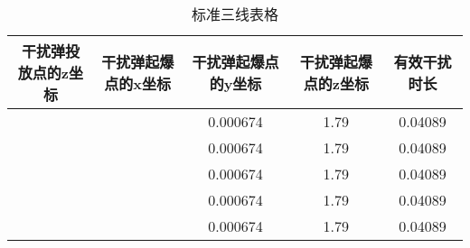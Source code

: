 \documentclass[../main.tex]{subfiles}
\begin{document}
\begin{table}[H]
\caption{标准三线表格}
\label{tab:031} 
\centering
\begin{small}
\begin{tabular}{ccccc}
\toprule[1.5pt]
    干扰弹投放点的z坐标 &干扰弹起爆点的x坐标&干扰弹起爆点的y坐标&干扰弹起爆点的z坐标&有效干扰时长\\
\midrule[1pt]
             &                   & 0.000674     & 1.79                    & 0.04089  \\               
             &                   & 0.000674     & 1.79                    & 0.04089  \\               
             &                   & 0.000674     & 1.79                    & 0.04089  \\                
             &                   & 0.000674     & 1.79                    & 0.04089  \\                
             &                   & 0.000674     & 1.79                    & 0.04089  \\               
\bottomrule[1.5pt]
\end{tabular}
\end{small}
\end{table}
\end{document}

